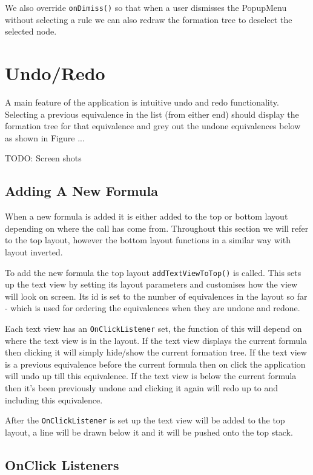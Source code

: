 \documentclass{report}
\begin{document}
We also override {\tt onDimiss()} so that when a user dismisses the PopupMenu without selecting a rule we can also redraw the formation tree to deselect the selected node.

\section{Undo/Redo}
\label{sec:undo_redo}

A main feature of the application is intuitive undo and redo functionality. Selecting a previous equivalence in the list (from either end) should display the formation tree for that equivalence and grey out the undone equivalences below as shown in Figure ...

TODO: Screen shots

\subsection{Adding A New Formula}

When a new formula is added it is either added to the top or bottom layout depending on where the call has come from. Throughout this section we will refer to the top layout, however the bottom layout functions in a similar way with layout inverted.

To add the new formula the top layout {\tt addTextViewToTop()} is called. This sets up the text view by setting its layout parameters and customises how the view will look on screen. Its id is set to the number of equivalences in the layout so far - which is used for ordering the equivalences when they are undone and redone.

Each text view has an {\tt OnClickListener} set, the function of this will depend on where the text view is in the layout. If the text view displays the current formula then clicking it will simply hide/show the current formation tree. If the text view is a previous equivalence before the current formula then on click the application will undo up till this equivalence. If the text view is below the current formula then it's been previously undone and clicking it again will redo up to and including this equivalence.

After the {\tt OnClickListener} is set up the text view will be added to the top layout, a line will be drawn below it and it will be pushed onto the top stack.

\subsection{OnClick Listeners}
\end{document}
